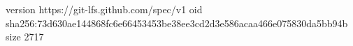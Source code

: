 version https://git-lfs.github.com/spec/v1
oid sha256:73d630ae144868fc6e66453453be38ee3cd2d3e586acaa466e075830da5bb94b
size 2717
